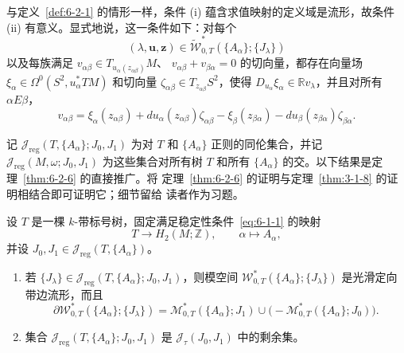 与定义~\ref{def:6-2-1} 的情形一样，条件 (i) 蕴含求值映射的定义域是流形，故条件 (ii)
有意义。显式地说，这一条件如下：对每个
\[
  (\lambda,\mathbf u,\mathbf z)
  \in\widetilde{\mathcal W}^*_{0,T}
  (\{A_\alpha\};\{J_\lambda\})
\]
以及每族满足
$v_{\alpha\beta}\in T_{u_\alpha(z_{\alpha\beta})}M$、
$v_{\alpha\beta}+v_{\beta\alpha}=0$ 的切向量，都存在向量场
$\xi_\alpha\in\Omega^0(S^2,u_\alpha^*TM)$ 和切向量
$\zeta_{\alpha\beta}\in T_{z_{\alpha\beta}}S^2$，使得
$D_{u_\alpha}\xi_\alpha\in\mathbb Rv_\lambda$，并且对所有 $\alpha E\beta$，
\[
  v_{\alpha\beta}
  =\xi_\alpha(z_{\alpha\beta})
   +du_\alpha(z_{\alpha\beta})\zeta_{\alpha\beta}
   -\xi_\beta(z_{\beta\alpha})
   -du_\beta(z_{\beta\alpha})\zeta_{\beta\alpha}.
\]

记 $\mathcal J_{\mathrm{reg}}(T,\{A_\alpha\};J_0,J_1)$ 为对
$T$ 和 $\{A_\alpha\}$ 正则的同伦集合，并记
$\mathcal J_{\mathrm{reg}}(M,\omega;J_0,J_1)$ 为这些集合对所有树 $T$ 和所有
$\{A_\alpha\}$ 的交。以下结果是定理~\ref{thm:6-2-6} 的直接推广。将
定理~\ref{thm:6-2-6} 的证明与定理~\ref{thm:3-1-8} 的证明相结合即可证明它；细节留给
读者作为习题。

\begin{theorem}\label{thm:6-2-11}
设 $T$ 是一棵 $k$-带标号树，固定满足稳定性条件~\eqref{eq:6-1-1} 的映射
\[
  T\longrightarrow H_2(M;\mathbb Z),
  \qquad \alpha\longmapsto A_\alpha,
\]
并设 $J_0,J_1\in\mathcal J_{\mathrm{reg}}(T,\{A_\alpha\})$。
\begin{enumerate}[label=(\roman*),leftmargin=3em]
\item 若
$\{J_\lambda\}\in
\mathcal J_{\mathrm{reg}}(T,\{A_\alpha\};J_0,J_1)$，则模空间
$\mathcal W^*_{0,T}(\{A_\alpha\};\{J_\lambda\})$ 是光滑定向带边流形，而且
\[
  \partial\mathcal W^*_{0,T}(\{A_\alpha\};\{J_\lambda\})
  =\mathcal M^*_{0,T}(\{A_\alpha\};J_1)
   \cup\bigl(-\mathcal M^*_{0,T}(\{A_\alpha\};J_0)\bigr).
\]
\item 集合
$\mathcal J_{\mathrm{reg}}(T,\{A_\alpha\};J_0,J_1)$ 是
$\mathcal J_\tau(J_0,J_1)$ 中的剩余集。
\end{enumerate}
\end{theorem}
